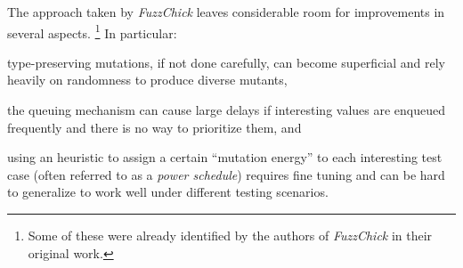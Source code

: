 \documentclass[acmsmall, anonymous]{acmart}
\newcommand{\fuzzchick}{\textit{FuzzChick}\xspace}
\begin{document}
%
%
%
%
The approach taken by \fuzzchick leaves considerable room for
improvements in several aspects.%
\footnote{Some of these were already identified by the authors of \fuzzchick in
  their original work.}
%
In particular:
%
\begin{inparaenum}
\item type-preserving mutations, if not done carefully, can become superficial
  and rely heavily on randomness to produce diverse mutants,
\item the queuing mechanism can cause large delays if interesting values are
  enqueued frequently and there is no way to prioritize them, and
\item using an heuristic to assign a certain ``mutation energy'' to each
  interesting test case (often referred to as a \emph{power schedule}) requires
  fine tuning and can be hard to generalize to work well under different testing
  scenarios.
\end{inparaenum}
%
\end{document}
